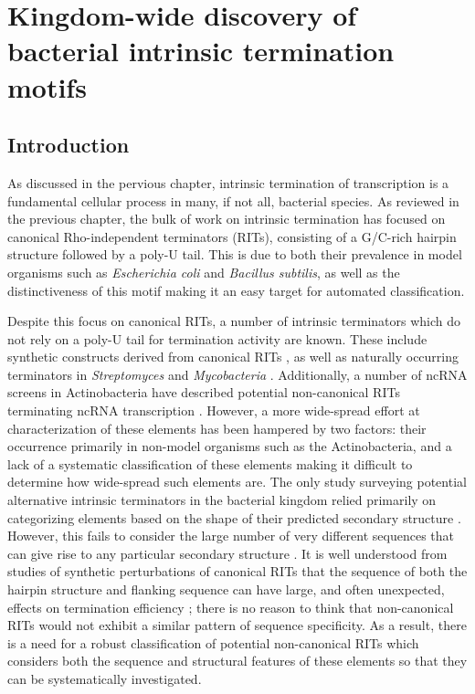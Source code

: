 
\chapter{Kingdom-wide discovery of bacterial intrinsic termination motifs}
\label{sec:chapterPingpong}
\ifpdf
    \graphicspath{{Chapter5/Chapter5Figs/EPS/}{Chapter5/Chapter5Figs/}}
\fi

\section{Introduction}

As discussed in the pervious chapter, intrinsic termination of transcription is a fundamental cellular process in many, if not all, bacterial species. As reviewed in the previous chapter, the bulk of work on intrinsic termination has focused on canonical Rho-independent terminators (RITs), consisting of a G/C-rich hairpin structure followed by a poly-U tail. This is due to both their prevalence in model organisms such as \textit{Escherichia coli} and \textit{Bacillus subtilis}, as well as the distinctiveness of this motif making it an easy target for automated classification.

Despite this focus on canonical RITs, a number of intrinsic terminators which do not rely on a poly-U tail for termination activity are known. These include synthetic constructs derived from canonical RITs \parencite{Abe1996}, as well as naturally occurring terminators in \textit{Streptomyces} \parencite{Deng1987, Neal1991, Ingham1995} and \textit{Mycobacteria} \parencite{Unniraman2001}. Additionally, a number of ncRNA screens in Actinobacteria have described potential non-canonical RITs terminating ncRNA transcription \parencite{Swiercz2008,Miotto2012, Li2013}.  However, a more wide-spread effort at characterization of these elements has been hampered by two factors: their occurrence primarily in non-model organisms such as the Actinobacteria, and a lack of a systematic classification of these elements making it difficult to determine how wide-spread such elements are. The only study surveying potential alternative intrinsic terminators in the bacterial kingdom relied primarily on categorizing elements based on the shape of their predicted secondary structure \parencite{Unniraman2002}. However, this fails to consider the large number of very different sequences that can give rise to any particular secondary structure \parencite{Schuster1994}. It is well understood from studies of synthetic perturbations of canonical RITs that the sequence of both the hairpin structure and flanking sequence can have large, and often unexpected, effects on termination efficiency \parencite{Reynolds1992, Abe1996, Cambray2013, Chen2013}; there is no reason to think that non-canonical RITs would not exhibit a similar pattern of sequence specificity. As a result, there is a need for a robust classification of potential non-canonical RITs which considers both the sequence and structural features of these elements so that they can be systematically investigated. 

